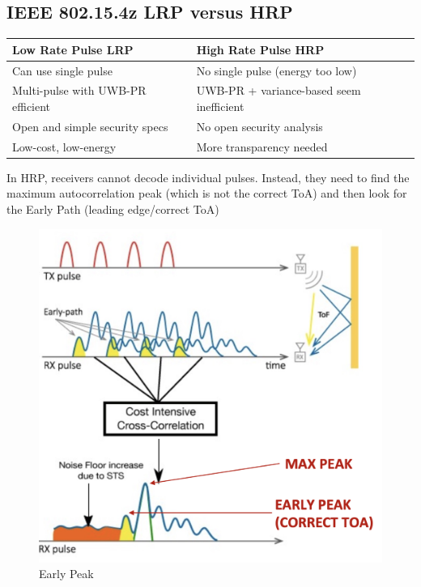 \subsection{IEEE 802.15.4z LRP versus HRP}
\begin{table}[h]
	\centering
	\begin{tabular}{ll}
	\hline
	Low Rate Pulse LRP                & High Rate Pulse HRP                      \\ \hline
	Can use single pulse              & No single pulse (energy too low)         \\
	Multi-pulse with UWB-PR efficient & UWB-PR + variance-based seem inefficient \\
	Open  and simple security specs   & No open security analysis                \\ 
	Low-cost, low-energy              & More transparency needed 		 \\ \hline      
	\end{tabular}
	\end{table}

In HRP, receivers cannot decode individual pulses. Instead, they need to find the maximum autocorrelation peak (which is not the correct ToA) and then look for the Early Path (leading edge/correct ToA)
\begin{figure}[h]
	\centering
	\includegraphics[scale=0.4]{images/5-early-peak.png}
	\caption{Early Peak}%
	\label{fig:earlypeak}
\end{figure}


